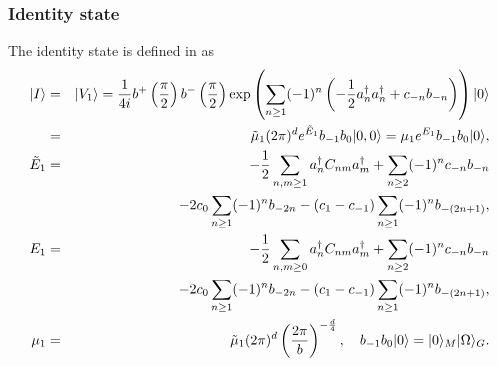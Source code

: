 \documentclass[12pt,a4paper]{article}
\begin{document}
\subsubsection{Identity state}

The identity state is defined in \cite{GJ(I)} as
\begin{eqnarray}
\label{eqn:IKE}
|I\rangle&=&|V_1\rangle={1\over4i}b^+\left({\pi\over2}\right)b^-\left({\pi\over2}\right)\exp\left(\sum_{n\geq1}(-1)^n\left(-{1\over2}a^\dagger_na^\dagger_n+ c_{-n}b_{-n}\right)\right)|0\rangle\nonumber \\
&=&{\tilde \mu}_1(2\pi)^d e^{{\tilde E}_1}b_{-1}b_0|0,0\rangle=\mu_1e^{E_1}b_{-1}b_0|0\rangle,\nonumber \\
{\tilde E}_1&=& -{1\over2}\sum_{n,m\geq1}a^\dagger_nC_{nm}a^\dagger_m+\sum_{n\geq2}(-1)^n c_{-n}b_{-n}\nonumber \\
&&-2 c_0\sum_{n\geq1}(-1)^n b_{-2n}-(c_1-c_{-1})\sum_{n\geq1}(-1)^nb_{-(2n+1)},\nonumber \\
E_1&=&-{1\over2}\sum_{n,m\geq0}a^\dagger_nC_{nm}a^\dagger_m+\sum_{n\geq2}(-1)^n c_{-n}b_{-n} \nonumber \\
&&-2 c_0\sum_{n\geq1}(-1)^n b_{-2n}-(c_1-c_{-1})\sum_{n\geq1}(-1)^nb_{-(2n+1)},\nonumber \\
\mu_1&=&{\tilde \mu}_1(2\pi)^d\left({2\pi\over b}\right)^{-{d\over4}},\ \ \ b_{-1}b_0|0\rangle=|0\rangle_M |\Omega\rangle_G.
\end{eqnarray}
\end{document}
